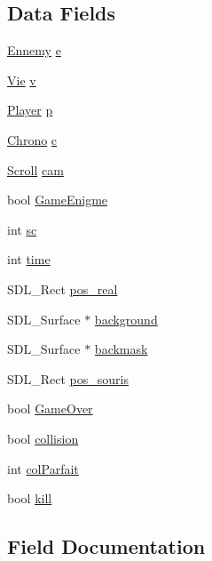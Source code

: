 \subsection*{Data Fields}
\begin{DoxyCompactItemize}
\item 
\hyperlink{structEnnemy}{Ennemy} \hyperlink{structgame_a9a6f9c4dbbed53b3db30408494f16c86}{e}
\item 
\hyperlink{structVie}{Vie} \hyperlink{structgame_ace63f61e0876a3bcf5285db08b43cb36}{v}
\item 
\hyperlink{structPlayer}{Player} \hyperlink{structgame_a1089163f69974caccc1b3fd9cdb2618f}{p}
\item 
\hyperlink{structChrono}{Chrono} \hyperlink{structgame_acbb63e13f36a1a563e71f3c5585d535b}{c}
\item 
\hyperlink{structScroll}{Scroll} \hyperlink{structgame_a049a316142be533b4ac476db39e73b18}{cam}
\item 
bool \hyperlink{structgame_a2d4f5ae14a366168dd19da1e83cd8ad7}{Game\+Enigme}
\item 
int \hyperlink{structgame_ae06e10da51741dbe8cf2977512e81c94}{sc}
\item 
int \hyperlink{structgame_a6e10d564623857f7732c73dc10a8ec1d}{time}
\item 
S\+D\+L\+\_\+\+Rect \hyperlink{structgame_a4b5119efed4eee7a84685a7272921439}{pos\+\_\+real}
\item 
S\+D\+L\+\_\+\+Surface $\ast$ \hyperlink{structgame_ab299a67ca3fdaf9ca8c4b1dd5c99129b}{background}
\item 
S\+D\+L\+\_\+\+Surface $\ast$ \hyperlink{structgame_a16cce3e91de3f657879f73af44aa7a25}{backmask}
\item 
S\+D\+L\+\_\+\+Rect \hyperlink{structgame_aaf6e725d199a2b7e3b1ebecdf64b4614}{pos\+\_\+souris}
\item 
bool \hyperlink{structgame_a5a1947382819a3b6182741f70ec7916b}{Game\+Over}
\item 
bool \hyperlink{structgame_a054464e92ab87658ffa7935942e5c4ed}{collision}
\item 
int \hyperlink{structgame_a9c565166ec535e0abed46299c525a607}{col\+Parfait}
\item 
bool \hyperlink{structgame_ac0f89bfe27ab94ee9bdb23d028449b60}{kill}
\end{DoxyCompactItemize}


\subsection{Field Documentation}
\mbox{\label{structgame_ab299a67ca3fdaf9ca8c4b1dd5c99129b}} 
